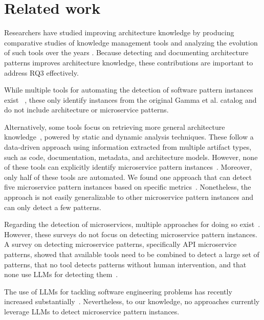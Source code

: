 \section{Related work}
\label{related-work}

Researchers have studied improving architecture knowledge by producing comparative studies of knowledge management tools and analyzing the evolution of such tools over the years \cite{tang_comparative_2010, capilla_10_2016}. Because detecting and documenting architecture patterns improves architecture knowledge, these contributions are important to address RQ3 effectively.

While multiple tools for automating the detection of software pattern instances exist
~\cite{keller_pattern-based_1999, 
diamantopoulos_dp-core_2016,
gueheneuc_demima_2008, 
antoniol_object-oriented_2001,
pan_machine_2023}, these only identify instances from the original Gamma et al. catalog and do not include architecture or microservice patterns.

Alternatively, some tools focus on retrieving more general architecture knowledge~\cite{zhang_software_2023, granchelli_microart_2017, fonseca_x-trace_2007, cuadrado_case_2008}, powered by static and dynamic analysis techniques. These follow a data-driven approach using information extracted from multiple artifact types, such as code, documentation, metadata, and architecture models. However, none of these tools can explicitly identify microservice pattern instances~\cite{jansen_software_2005}. Moreover, only half of these tools are automated. We found one approach that can detect five microservice pattern instances based on specific metrics~\cite{daniel_towards_2023}. Nonetheless, the approach is not easily generalizable to other microservice pattern instances and can only detect a few patterns. 

Regarding the detection of microservices, multiple approaches for doing so exist~\cite{de_paoli_microservices_2017, dustdar_qualitative_2020}. However, these surveys do not focus on detecting microservice pattern instances. A survey on detecting microservice patterns, specifically API microservice patterns, showed that available tools need to be combined to detect a large set of patterns, that no tool detects patterns without human intervention, and that none use LLMs for detecting them~\cite{bakhtin_survey_2022}.

The use of LLMs for tackling software engineering problems has recently increased substantially~\cite{jahic_state_2024, steffen_large_2024, ampatzoglou_mapping_2024}. Nevertheless, to our knowledge, no approaches currently leverage LLMs to detect microservice pattern instances.

